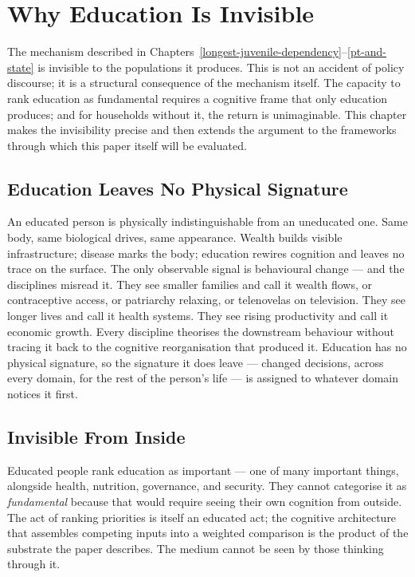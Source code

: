 \documentclass[12pt,letterpaper]{article}
\begin{document}
\section{Why Education Is Invisible}\label{why-education-is-invisible}

The mechanism described in Chapters~\ref{longest-juvenile-dependency}--\ref{pt-and-state}
is invisible to the populations it produces. This is not an accident
of policy discourse; it is a structural consequence of the mechanism
itself. The capacity to rank education as fundamental requires a
cognitive frame that only education produces; and for households
without it, the return is unimaginable. This chapter makes the
invisibility precise and then extends the argument to the frameworks
through which this paper itself will be evaluated.

\subsection{Education Leaves No Physical Signature}\label{education-leaves-no-physical-signature}

An educated person is physically indistinguishable from an uneducated
one. Same body, same biological drives, same appearance. Wealth builds
visible infrastructure; disease marks the body; education rewires
cognition and leaves no trace on the surface. The only observable signal
is behavioural change --- and the disciplines misread it. They see
smaller families and call it wealth flows, or contraceptive access, or
patriarchy relaxing, or telenovelas on television. They see longer
lives and call it health systems. They see rising productivity and
call it economic growth. Every discipline
theorises the downstream behaviour without tracing it back to the
cognitive reorganisation that produced it. Education has no physical
signature, so the signature it does leave --- changed decisions, across
every domain, for the rest of the person's life --- is assigned to
whatever domain notices it first.

\subsection{Invisible From Inside}\label{invisible-from-inside}

Educated people rank education as important --- one of many important
things, alongside health, nutrition, governance, and security. They
cannot categorise it as \emph{fundamental} because that would require
seeing their own cognition from outside. The act of ranking priorities
is itself an educated act; the cognitive architecture that assembles
competing inputs into a weighted comparison is the product of the
substrate the paper describes. The medium cannot be seen by those
thinking through it.
\end{document}
